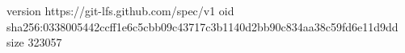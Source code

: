 version https://git-lfs.github.com/spec/v1
oid sha256:0338005442ccff1e6c5cbb09c43717c3b1140d2bb90c834aa38c59fd6e11d9dd
size 323057
